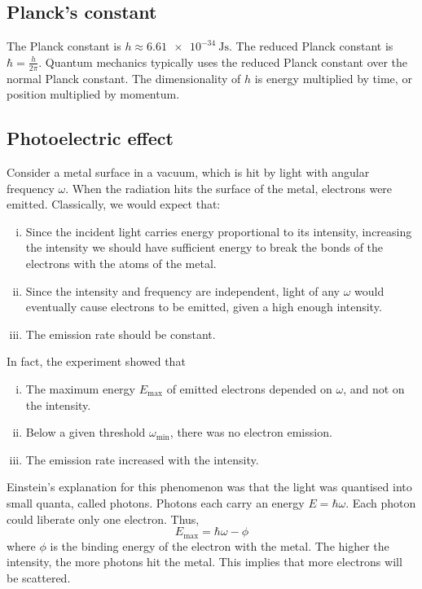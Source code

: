 \subsection{Planck's constant}
The Planck constant is \( h \approx \SI{6.61e-34}{\joule\second} \).
The reduced Planck constant is \( \hbar = \frac{h}{2\pi} \).
Quantum mechanics typically uses the reduced Planck constant over the normal Planck constant.
The dimensionality of \( h \) is energy multiplied by time, or position multiplied by momentum.

\subsection{Photoelectric effect}
Consider a metal surface in a vacuum, which is hit by light with angular frequency \( \omega \).
When the radiation hits the surface of the metal, electrons were emitted.
Classically, we would expect that:
\begin{enumerate}[(i)]
	\item Since the incident light carries energy proportional to its intensity, increasing the intensity we should have sufficient energy to break the bonds of the electrons with the atoms of the metal.
	\item Since the intensity and frequency are independent, light of any \( \omega \) would eventually cause electrons to be emitted, given a high enough intensity.
	\item The emission rate should be constant.
\end{enumerate}
In fact, the experiment showed that
\begin{enumerate}[(i)]
	\item The maximum energy \( E_{\max} \) of emitted electrons depended on \( \omega \), and not on the intensity.
	\item Below a given threshold \( \omega_{\min} \), there was no electron emission.
	\item The emission rate increased with the intensity.
\end{enumerate}
Einstein's explanation for this phenomenon was that the light was quantised into small quanta, called photons.
Photons each carry an energy \( E = \hbar \omega \).
Each photon could liberate only one electron.
Thus,
\[
	E_{\max} = \hbar \omega - \phi
\]
where \( \phi \) is the binding energy of the electron with the metal.
The higher the intensity, the more photons hit the metal.
This implies that more electrons will be scattered.

